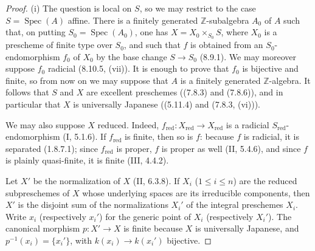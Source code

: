 \begin{proof}
\textup{(i)} The question is local on $S$, so we may restrict to the
case $S=\operatorname{Spec}(A)$ affine.  There is a finitely generated
$\mathbb Z$-subalgebra $A_0$ of $A$ such that, on putting
$S_0=\operatorname{Spec}(A_0)$, one has
$X=X_0\times_{S_0}S$, where $X_0$ is a prescheme of finite type over
$S_0$, and such that $f$ is obtained from an $S_0$-endomorphism $f_0$
of $X_0$ by the base change $S\to S_0$ (8.9.1).  We may moreover
suppose $f_0$ radicial (8.10.5, (vii)).  It is enough to prove that
$f_0$ is bijective and finite, so from now on we may suppose that $A$
is a finitely generated $\mathbb Z$-algebra.  It follows that $S$ and
$X$ are excellent preschemes ((7.8.3) and (7.8.6)), and in particular
that $X$ is universally Japanese ((5.11.4) and (7.8.3, (vi))).

We may also suppose $X$ reduced.  Indeed,
$f_{\mathrm{red}}:X_{\mathrm{red}}\to X_{\mathrm{red}}$ is a radicial
$S_{\mathrm{red}}$-endomorphism (I, 5.1.6).  If
$f_{\mathrm{red}}$ is finite, then so is $f$: because $f$ is radicial,
it is separated (1.8.7.1); since $f_{\mathrm{red}}$ is proper, $f$ is
proper as well (II, 5.4.6), and since $f$ is plainly quasi-finite, it is
finite (III, 4.4.2).

Let $X'$ be the normalization of $X$ (II, 6.3.8).  If
$X_i$ ($1\leq i\leq n$) are the reduced subpreschemes of $X$ whose
underlying spaces are its irreducible components, then $X'$ is the
disjoint sum of the normalizations $X_i'$ of the integral preschemes
$X_i$.  Write $x_i$ (respectively $x_i'$) for the generic point of
$X_i$ (respectively $X_i'$).  The canonical morphism $p:X'\to X$ is
finite because $X$ is universally Japanese, and
$p^{-1}(x_i)=\{x_i'\}$, with $k(x_i)\to k(x_i')$ bijective.


\end{proof}
